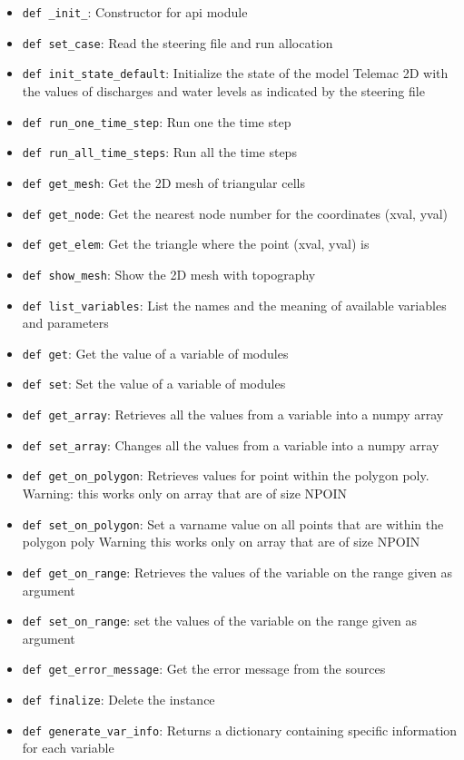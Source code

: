 \begin{itemize}
\item \verb+def _init_+: Constructor for api module
\item \verb+def set_case+: Read the steering file and run allocation
\item \verb+def init_state_default+: Initialize the state of the model Telemac
  2D with the values of discharges and water levels as indicated by the steering
  file
\item \verb+def run_one_time_step+: Run one the time step
\item \verb+def run_all_time_steps+: Run all the time steps
\item \verb+def get_mesh+: Get the 2D mesh of triangular cells
\item \verb+def get_node+: Get the nearest node number for the coordinates
  (xval, yval)
\item \verb+def get_elem+: Get the triangle where the point (xval, yval) is
\item \verb+def show_mesh+: Show the 2D mesh with topography
\item \verb+def list_variables+: List the names and the meaning of available
  variables and parameters
\item \verb+def get+: Get the value of a variable of \telemacsystem modules
\item \verb+def set+: Set the value of a variable of \telemacsystem modules
\item \verb+def get_array+: Retrieves all the values from a variable into a
  numpy array
\item \verb+def set_array+: Changes all the values from a variable into a numpy
  array
\item \verb+def get_on_polygon+: Retrieves values for point within the polygon
  poly. Warning: this works only on array that are of size NPOIN
\item \verb+def set_on_polygon+: Set a varname value on all points that are
  within the polygon poly Warning this works only on array that are of size
  NPOIN
\item \verb+def get_on_range+: Retrieves the values of the variable on the
  range given as argument
\item \verb+def set_on_range+: set the values of the variable on the range
  given as argument
\item \verb+def get_error_message+: Get the error message from the \fortran
  sources
\item \verb+def finalize+: Delete the \telemacsystem instance
\item \verb+def generate_var_info+: Returns a dictionary containing specific
  information for each variable
\end{itemize}

